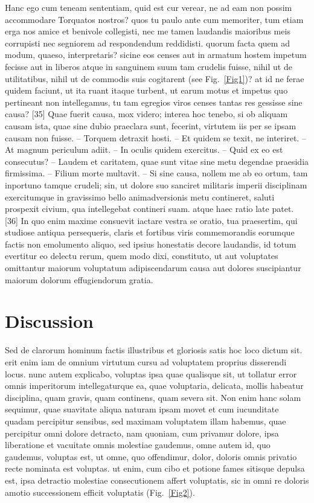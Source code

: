 \documentclass[a4paper,11pt,twoside]{article}
\begin{document}
Hanc ego cum teneam sententiam, quid est cur verear, ne ad eam non possim accommodare
Torquatos nostros? quos tu paulo ante cum memoriter, tum etiam erga nos amice et benivole
collegisti, nec me tamen laudandis maioribus meis corrupisti nec segniorem ad respondendum
reddidisti. quorum facta quem ad modum, quaeso, interpretaris? sicine eos censes aut in
armatum hostem impetum fecisse aut in liberos atque in sanguinem suum tam crudelis fuisse,
nihil ut de utilitatibus, nihil ut de commodis suis cogitarent (see Fig.~\ref{Fig1})?
at id ne ferae quidem faciunt, ut ita ruant itaque turbent, ut earum motus et impetus quo
pertineant non intellegamus, tu tam egregios viros censes tantas res gessisse sine causa?
[35] Quae fuerit causa, mox videro; interea hoc tenebo, si ob aliquam causam ista, quae
sine dubio praeclara sunt, fecerint, virtutem iis per se ipsam causam non fuisse. --
Torquem detraxit hosti. -- Et quidem se texit, ne interiret. -- At magnum periculum
adiit. -- In oculis quidem exercitus. -- Quid ex eo est consecutus? -- Laudem et
caritatem, quae sunt vitae sine metu degendae praesidia firmissima. -- Filium morte
multavit. -- Si sine causa, nollem me ab eo ortum, tam inportuno tamque crudeli; sin, ut
dolore suo sanciret militaris imperii disciplinam exercitumque in gravissimo bello
animadversionis metu contineret, saluti prospexit civium, qua intellegebat contineri
suam. atque haec ratio late patet. [36] In quo enim maxime consuevit iactare vestra se
oratio, tua praesertim, qui studiose antiqua persequeris, claris et fortibus viris
commemorandis eorumque factis non emolumento aliquo, sed ipsius honestatis decore
laudandis, id totum evertitur eo delectu rerum, quem modo dixi, constituto, ut aut
voluptates omittantur maiorum voluptatum adipiscendarum causa aut dolores suscipiantur
maiorum dolorum effugiendorum gratia.


\section*{Discussion}

Sed de clarorum hominum factis illustribus et gloriosis satis hoc loco dictum sit. erit
enim iam de omnium virtutum cursu ad voluptatem proprius disserendi locus. nunc autem
explicabo, voluptas ipsa quae qualisque sit, ut tollatur error omnis imperitorum
intellegaturque ea, quae voluptaria, delicata, mollis habeatur disciplina, quam gravis,
quam continens, quam severa sit. Non enim hanc solam sequimur, quae suavitate aliqua
naturam ipsam movet et cum iucunditate quadam percipitur sensibus, sed maximam voluptatem
illam habemus, quae percipitur omni dolore detracto, nam quoniam, cum privamur dolore,
ipsa liberatione et vacuitate omnis molestiae gaudemus, omne autem id, quo gaudemus,
voluptas est, ut omne, quo offendimur, dolor, doloris omnis privatio recte nominata est
voluptas. ut enim, cum cibo et potione fames sitisque depulsa est, ipsa detractio
molestiae consecutionem affert voluptatis, sic in omni re doloris amotio successionem
efficit voluptatis (Fig.~\ref{Fig2}). 
\end{document}
